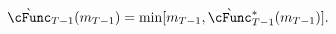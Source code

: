   \begin{equation}\begin{gathered}\begin{aligned}
    \grave{\cFunc}_{T-1}({m}_{T-1})  & = \min[{m}_{T-1},\grave{\cFunc}^{\ast}_{T-1}({m}_{T-1})] \label{eq:LiqCons}.
  \end{aligned}\end{gathered}\end{equation}
